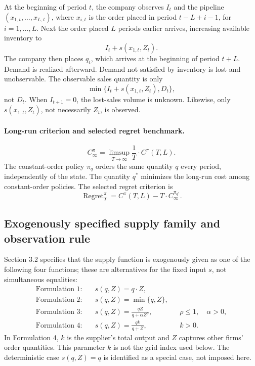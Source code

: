 \documentclass{article}
\begin{document}
At the beginning of period \(t\), the company observes \(I_t\) and the pipeline \((x_{1,t},\ldots,x_{L,t})\), where \(x_{i,t}\) is the order placed in period \(t-L+i-1\), for \(i=1,\ldots,L\). Next the order placed \(L\) periods earlier arrives, increasing available inventory to
\[
I_t+s(x_{1,t},Z_t).
\]
The company then places \(q_t\), which arrives at the beginning of period \(t+L\). Demand is realized afterward. Demand not satisfied by inventory is lost and unobservable. The observable sales quantity is only
\[
\min\{I_t+s(x_{1,t},Z_t),D_t\},
\]
not \(D_t\). When \(I_{t+1}=0\), the lost-sales volume is unknown. Likewise, only \(s(x_{1,t},Z_t)\), not necessarily \(Z_t\), is observed.

\paragraph{Long-run criterion and selected regret benchmark.}
\begin{equation}
C_\infty^\pi=\limsup_{T\to\infty}\frac{1}{T}\cdot C^\pi(T,L).\tag{2}
\end{equation}
The constant-order policy \(\pi_q\) orders the same quantity \(q\) every period, independently of the state. The quantity \(q^*\) minimizes the long-run cost among constant-order policies. The selected regret criterion is
\begin{equation}
\operatorname{Regret}_T^\pi
=C^\pi(T,L)-T\cdot C_\infty^{\pi_{q^*}}.\tag{3}
\end{equation}

\subsection*{Exogenously specified supply family and observation rule}
Section 3.2 specifies that the supply function is exogenously given as one of the following four functions; these are alternatives for the fixed input \(s\), not simultaneous equalities:
\begin{align*}
\text{Formulation 1:}\quad&s(q,Z)=q\cdot Z,\\
\text{Formulation 2:}\quad&s(q,Z)=\min\{q,Z\},\\
\text{Formulation 3:}\quad&s(q,Z)=\frac{qZ}{q+\alpha Z^\rho},
&&\rho\leq1,\quad\alpha>0,\\
\text{Formulation 4:}\quad&s(q,Z)=\frac{qk}{q+Z},
&&k>0.
\end{align*}
In Formulation 4, \(k\) is the supplier's total output and \(Z\) captures other firms' order quantities. This parameter \(k\) is not the grid index used below. The deterministic case \(s(q,Z)=q\) is identified as a special case, not imposed here.
\end{document}
